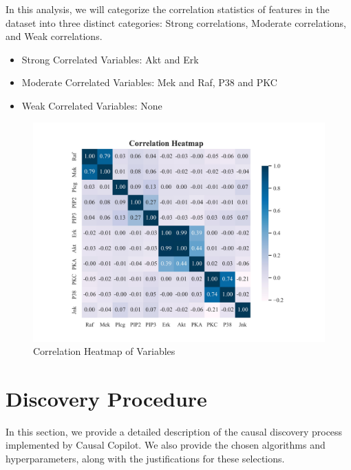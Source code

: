 \documentclass{article}
\begin{document}
\begin{minipage}[t]{0.5\linewidth}
    In this analysis, we will categorize the correlation statistics of features in the dataset into three distinct categories: Strong correlations, Moderate correlations, and Weak correlations.

\begin{itemize}
\item Strong Correlated Variables: Akt and Erk
\item Moderate Correlated Variables: Mek and Raf, P38 and PKC
\item Weak Correlated Variables: None
\end{itemize}
\vfill
\end{minipage}
\hfill
\begin{minipage}[t]{0.5\linewidth}
    \begin{figure}[H]
        \centering
        \vspace{-1.5cm}
        \includegraphics[width=\linewidth]{./demo_data/20241104_135804/sachs/output_graph/eda_corr.jpg}
        \caption{\label{fig:corr}Correlation Heatmap of Variables}
    \end{figure}
\end{minipage}

\section{Discovery Procedure}

In this section, we provide a detailed description of the causal discovery process implemented by Causal Copilot. 
We also provide the chosen algorithms and hyperparameters, along with the justifications for these selections.
\end{document}
